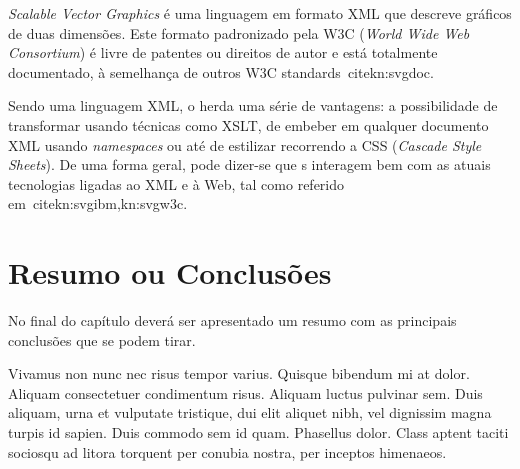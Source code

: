 \emph{Scalable Vector Graphics} é uma
linguagem em formato XML que descreve gráficos de duas dimensões. 
Este formato padronizado pela W3C (\emph{World Wide Web Consortium})
é livre de patentes ou direitos de autor e está totalmente
documentado, à semelhança de outros W3C
standards~cite{kn:svgdoc}.

Sendo uma linguagem XML, o \svg{} herda uma série de vantagens: a
possibilidade de transformar \svg{} usando técnicas como
XSLT, de embeber \svg{} em qualquer documento
XML usando \textit{namespaces} ou até de  
estilizar \svg{} recorrendo a CSS (\emph{Cascade Style Sheets}). 
De uma forma geral, pode dizer-se que \svg{}s interagem bem com as
atuais tecnologias ligadas ao XML e à Web, tal como referido
em~cite{kn:svgibm,kn:svgw3c}.

\section{Resumo ou Conclusões}

No final do capítulo deverá ser apresentado um resumo com as 
principais conclusões que se podem tirar. 

Vivamus non nunc nec risus tempor varius. Quisque bibendum mi at
dolor. Aliquam consectetuer condimentum risus. Aliquam luctus pulvinar
sem. Duis aliquam, urna et vulputate tristique, dui elit aliquet nibh,
vel dignissim magna turpis id sapien. Duis commodo sem id
quam. Phasellus dolor. Class aptent taciti sociosqu ad litora torquent
per conubia nostra, per inceptos himenaeos. 
